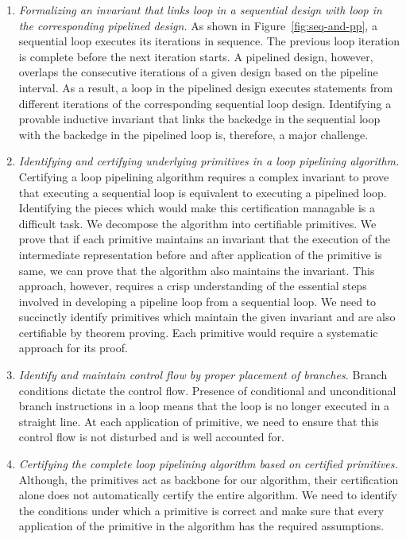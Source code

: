 \begin{enumerate}[--]
\item {\em Formalizing an invariant that links loop in a sequential design with loop in the corresponding pipelined design.} As shown in Figure~\ref{fig:seq-and-pp}, a sequential loop executes its iterations in sequence. The previous loop iteration is complete before the next iteration starts. A pipelined design, however, overlaps the consecutive iterations of a given design based on the pipeline interval. As a result, a loop in the pipelined design executes statements from different iterations of the corresponding sequential loop design. Identifying a provable inductive invariant that links the backedge in the sequential loop with the backedge in the pipelined loop is, therefore, a major challenge.
\item {\em Identifying and certifying underlying primitives in a loop pipelining algorithm.} Certifying a loop pipelining algorithm requires a complex invariant to prove that executing a sequential loop is equivalent to executing a pipelined loop. Identifying the pieces which would make this certification managable is a difficult task. We decompose the algorithm into certifiable primitives. We prove that if each primitive maintains an invariant that the execution of the intermediate representation before and after application of the primitive is same, we can prove that the algorithm also maintains the invariant. This approach, however, requires a crisp understanding of the essential steps involved in developing a pipeline loop from a sequential loop. We need to succinctly identify primitives which maintain the given invariant and are also certifiable by theorem proving. Each primitive would require a systematic approach for its proof.
\item {\em Identify and maintain control flow by proper placement of branches.}  Branch conditions dictate the control flow. Presence of conditional and unconditional branch instructions in a loop means that the loop is no longer executed in a straight line. At each application of primitive, we need to ensure that this control flow is not disturbed and is well accounted for. 
\item {\em Certifying the complete loop pipelining algorithm based on certified primitives.} Although, the primitives act as backbone for our algorithm, their certification alone does not automatically certify the entire algorithm. We need to identify the conditions under which a primitive is correct and make sure that every application of the primitive in the algorithm has the required assumptions.
\end{enumerate}

